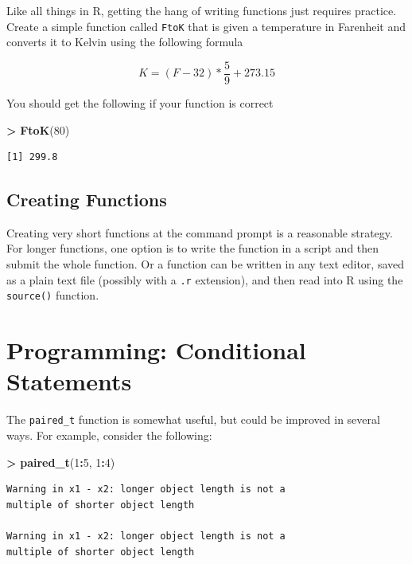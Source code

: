 \documentclass[]{krantz}
\makeatletter
\newenvironment{Shaded}{\begin{snugshade}}{\end{snugshade}}
\newcommand{\KeywordTok}[1]{\textcolor[rgb]{0.27,0.27,0.27}{\textbf{#1}}}
\newcommand{\DecValTok}[1]{\textcolor[rgb]{0.06,0.06,0.06}{#1}}
\newcommand{\StringTok}[1]{\textcolor[rgb]{0.5,0.5,0.5}{#1}}
\newcommand{\OperatorTok}[1]{\textcolor[rgb]{0.43,0.43,0.43}{\textbf{#1}}}
\newcommand{\NormalTok}[1]{#1}
\newenvironment{kframe}{%
\medskip{}
\setlength{\fboxsep}{.8em}
 \def\at@end@of@kframe{}%
 \ifinner\ifhmode%
  \def\at@end@of@kframe{\end{minipage}}%
  \begin{minipage}{\columnwidth}%
 \fi\fi%
 \def\FrameCommand##1{\hskip\@totalleftmargin \hskip-\fboxsep
 \colorbox{shadecolor}{##1}\hskip-\fboxsep
     \hskip-\linewidth \hskip-\@totalleftmargin \hskip\columnwidth}%
 \MakeFramed {\advance\hsize-\width
   \@totalleftmargin\z@ \linewidth\hsize
   \@setminipage}}%
 {\par\unskip\endMakeFramed%
 \at@end@of@kframe}
\renewenvironment{Shaded}{\begin{kframe}}{\end{kframe}}
\makeatother
\begin{document}
Like all things in R, getting the hang of writing functions just
requires practice. Create a simple function called \texttt{FtoK} that is
given a temperature in Farenheit and converts it to Kelvin using the
following formula

\[
K = (F - 32) * \frac{5}{9} + 273.15
\]

You should get the following if your function is correct

\begin{Shaded}
\begin{Highlighting}[]
\OperatorTok{>}\StringTok{ }\KeywordTok{FtoK}\NormalTok{(}\DecValTok{80}\NormalTok{)}
\end{Highlighting}
\end{Shaded}

\begin{verbatim}
[1] 299.8
\end{verbatim}

\subsection{Creating Functions}\label{creating-functions}

Creating very short functions at the command prompt is a reasonable
strategy. For longer functions, one option is to write the function in a
script and then submit the whole function. Or a function can be written
in any text editor, saved as a plain text file (possibly with a
\texttt{.r} extension), and then read into R using the \texttt{source()}
function.

\section{Programming: Conditional
Statements}\label{programming-conditional-statements}

The \texttt{paired\_t} function is somewhat useful, but could be
improved in several ways. For example, consider the following:

\begin{Shaded}
\begin{Highlighting}[]
\OperatorTok{>}\StringTok{ }\KeywordTok{paired_t}\NormalTok{(}\DecValTok{1}\OperatorTok{:}\DecValTok{5}\NormalTok{, }\DecValTok{1}\OperatorTok{:}\DecValTok{4}\NormalTok{)}
\end{Highlighting}
\end{Shaded}

\begin{verbatim}
Warning in x1 - x2: longer object length is not a
multiple of shorter object length

Warning in x1 - x2: longer object length is not a
multiple of shorter object length
\end{verbatim}
\end{document}
